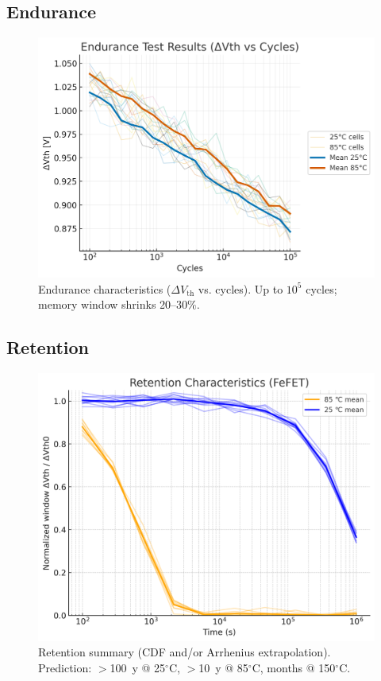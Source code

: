\documentclass[conference]{IEEEtran}
\newcommand{\RETENTIONFig}{figures/retention_cdf_weibull.png}
\begin{document}
\subsection{Endurance}
\begin{figure}[!t]
  \centering
  \includegraphics[width=0.95\linewidth]{figures/fig5_endurance.png}
  \caption{Endurance characteristics ($\Delta V_{\mathrm{th}}$ vs. cycles). Up to $10^5$ cycles; memory window shrinks 20--30\%.}
  \label{fig:endurance}
\end{figure}

\subsection{Retention}
\begin{figure}[!t]
  \centering
  \includegraphics[width=0.95\linewidth]{figures/fig6_retention.png}
  \caption{Retention summary (CDF and/or Arrhenius extrapolation). Prediction: $>$100~y @ 25$^\circ$C, $>$10~y @ 85$^\circ$C, months @ 150$^\circ$C.}
  \label{fig:retention}
\end{figure}
\end{document}
